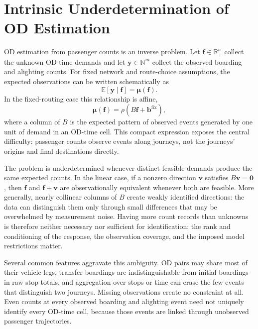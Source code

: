 
\section{Intrinsic Underdetermination of OD Estimation}
\label{sec:intrinsic-underdetermination}

OD estimation from passenger counts is an inverse problem.  Let
$\bm f\in\mathbb{R}_{+}^{n}$ collect the unknown OD-time demands and let
$\bm y\in\mathbb{N}^{m}$ collect the observed boarding and alighting counts.
For fixed network and route-choice assumptions, the expected observations can
be written schematically as
\[
  \mathbb{E}[\bm y\mid\bm f]=\bm\mu(\bm f).
\]
In the fixed-routing case this relationship is affine,
\begin{equation}
  \bm\mu(\bm f)=\rho\left(B\bm f+\bm b^{\mathrm{fix}}\right),
  \label{eq:part1-linear-observation}
\end{equation}
where a column of $B$ is the expected pattern of observed events generated by
one unit of demand in an OD-time cell.  This compact expression exposes the
central difficulty: passenger counts observe events along journeys, not the
journeys' origins and final destinations directly.

The problem is underdetermined whenever distinct feasible demands produce the
same expected counts.  In the linear case, if a nonzero direction $\bm v$
satisfies $B\bm v=\bm 0$, then $\bm f$ and $\bm f+\bm v$ are observationally
equivalent whenever both are feasible.  More generally, nearly collinear
columns of $B$ create weakly identified directions: the data can distinguish
them only through small differences that may be overwhelmed by measurement
noise.  Having more count records than unknowns is therefore neither necessary
nor sufficient for identification; the rank and conditioning of the response,
the observation coverage, and the imposed model restrictions matter.

Several common features aggravate this ambiguity.  OD pairs may share most of
their vehicle legs, transfer boardings are indistinguishable from initial
boardings in raw stop totals, and aggregation over stops or time can erase the
few events that distinguish two journeys.  Missing observations create no
constraint at all.  Even counts at every observed boarding and alighting event
need not uniquely identify every OD-time cell, because those events are linked
through unobserved passenger trajectories.


